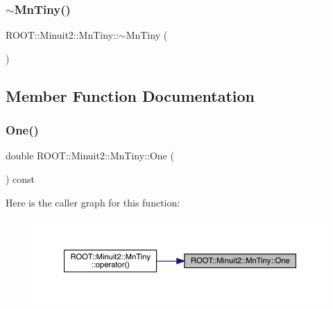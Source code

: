 \subsubsection{\texorpdfstring{$\sim$MnTiny()}{~MnTiny()}\hspace{0.1cm}{\footnotesize\ttfamily [2/2]}}
{\footnotesize\ttfamily R\+O\+O\+T\+::\+Minuit2\+::\+Mn\+Tiny\+::$\sim$\+Mn\+Tiny (\begin{DoxyParamCaption}{ }\end{DoxyParamCaption})\hspace{0.3cm}{\ttfamily [inline]}}



\subsection{Member Function Documentation}
\mbox{\label{classROOT_1_1Minuit2_1_1MnTiny_a5934fc324da865f57dc05e5182248677}} 
\subsubsection{\texorpdfstring{One()}{One()}\hspace{0.1cm}{\footnotesize\ttfamily [1/2]}}
{\footnotesize\ttfamily double R\+O\+O\+T\+::\+Minuit2\+::\+Mn\+Tiny\+::\+One (\begin{DoxyParamCaption}{ }\end{DoxyParamCaption}) const}

Here is the caller graph for this function\+:\nopagebreak
\begin{figure}[H]
\begin{center}
\leavevmode
\includegraphics[width=350pt]{d6/d77/classROOT_1_1Minuit2_1_1MnTiny_a5934fc324da865f57dc05e5182248677_icgraph}
\end{center}
\end{figure}
\mbox{\label{classROOT_1_1Minuit2_1_1MnTiny_a5934fc324da865f57dc05e5182248677}} 
